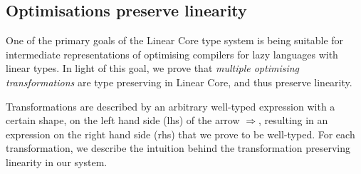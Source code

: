 \documentclass[acmsmall,review]{acmart}
\begin{document}



%
%
%
%

\subsection{Optimisations preserve linearity\label{sec:optimisations-preserve-types-meta}}

One of the primary goals of the Linear Core type system is being suitable for
intermediate representations of optimising compilers for lazy languages with
linear types. In light of this goal, we prove that \emph{multiple optimising
transformations} are type preserving in Linear Core, and thus preserve linearity.

Transformations are described by an arbitrary well-typed expression with a certain shape, on
the left hand side (lhs) of the arrow $\Longrightarrow$, resulting in an expression on
the right hand side (rhs) that we prove to be well-typed.
%
%
For each transformation, we describe the intuition behind the transformation
preserving linearity in our system.
\end{document}
